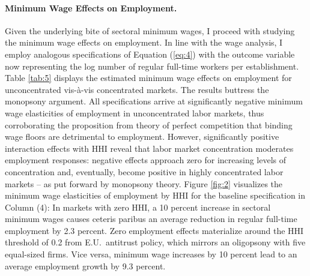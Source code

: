 \documentclass[11pt,oneside,reqno,xcolor=dvipsnames]{article} %
\begin{document}
\paragraph{Minimum Wage Effects on Employment.} Given the underlying bite of sectoral minimum wages, I proceed with studying the minimum wage effects on employment. In line with the wage analysis, I employ analogous specifications of Equation (\ref{eq:4}) with the outcome variable now representing the log number of regular full-time workers per establishment. Table \ref{tab:5} displays the estimated minimum wage effects on employment for unconcentrated vis-\`{a}-vis concentrated markets. The results buttress the monopsony argument. All specifications arrive at significantly negative minimum wage elasticities of employment in unconcentrated labor markets, thus corroborating the proposition from theory of perfect competition that binding wage floors are detrimental to employment. However, significantly positive interaction effects with HHI reveal that labor market concentration moderates employment responses: negative effects approach zero for increasing levels of concentration and, eventually, become positive in highly concentrated labor markets -- as put forward by monopsony theory. Figure \ref{fig:2} visualizes the minimum wage elasticities of employment by HHI for the baseline specification in Column (4): In markets with zero HHI, a 10 percent increase in sectoral minimum wages causes ceteris paribus an average reduction in regular full-time employment by 2.3 percent. Zero employment effects materialize around the HHI threshold of 0.2 from E.U.\ antitrust policy, which mirrors an oligopsony with five equal-sized firms. Vice versa, minimum wage increases by 10 percent lead to an average employment growth by 9.3 percent.
\end{document}
